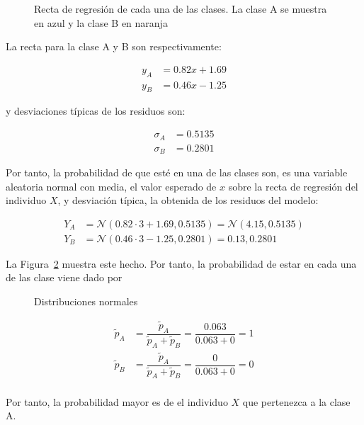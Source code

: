 \begin{ejemplo}
	\begin{figure}[htbp!]
		\centering
		\regresionred
		\caption[Recta de regresión de cada una de las clases]{Recta de regresión de cada una de las clases. La clase A se muestra en azul y la clase B en naranja}
		\label{fig:reg_rectas}
	\end{figure}
	
	La recta para la clase A y B son respectivamente:
	
	\begin{align*}
	y_A & = 0.82x + 1.69 \\
	y_B & = 0.46x - 1.25
	\end{align*}
	
	y desviaciones típicas de los residuos son:
	
	\begin{align*}
	\sigma_A & = 0.5135\\
	\sigma_B & = 0.2801
	\end{align*}
	
	Por tanto, la probabilidad de que esté en una de las clases son, es una variable aleatoria normal con media, el valor esperado de $x$ sobre la recta de regresión del individuo $X$, y desviación típica, la obtenida de los residuos del modelo:
	
	\begin{align*}
	Y_A & = \mathcal{N}(0.82\cdot 3 + 1.69, 0.5135) = \mathcal{N}(4.15, 0.5135)\\
	Y_B & = \mathcal{N}(0.46\cdot 3 - 1.25, 0.2801) = \mathcal{0.13, 0.2801}
	\end{align*}
	
	La Figura~\ref{fig:dist_normales} muestra este hecho. Por tanto, la probabilidad de estar en cada una de las clase viene dado por 
	
	\begin{figure}[htbp!]
		\centering
		\distnormales
		\caption{Distribuciones normales}
		\label{fig:dist_normales}
	\end{figure}
	
	\begin{align*}
	\tilde{p}_A & = \dfrac{\tilde{p}_A}{\tilde{p}_A + \tilde{p}_B} = \dfrac{0.063}{0.063 + 0} = 1 \\
	\tilde{p}_B & = \dfrac{\tilde{p}_A}{\tilde{p}_A + \tilde{p}_B} = \dfrac{0}{0.063 + 0} = 0 \\
	\end{align*}
	
	Por tanto, la probabilidad mayor es de el individuo $X$ que pertenezca a la clase A.\\
	

\end{ejemplo}
